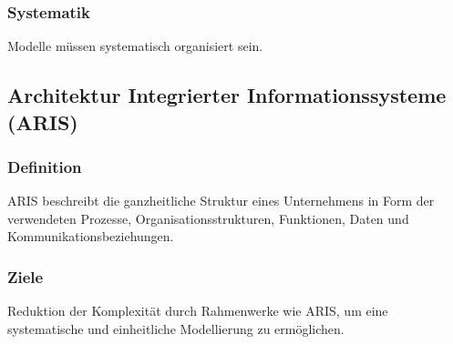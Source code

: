     \subsubsection*{Systematik}
        Modelle müssen systematisch organisiert sein.

\subsection{Architektur Integrierter Informationssysteme (ARIS)}
    \subsubsection*{Definition}
        ARIS beschreibt die ganzheitliche Struktur eines Unternehmens in Form der verwendeten Prozesse, Organisationsstrukturen, Funktionen, Daten und Kommunikationsbeziehungen.
    \subsubsection*{Ziele}
        Reduktion der Komplexität durch Rahmenwerke wie ARIS, um eine systematische und einheitliche Modellierung zu ermöglichen.